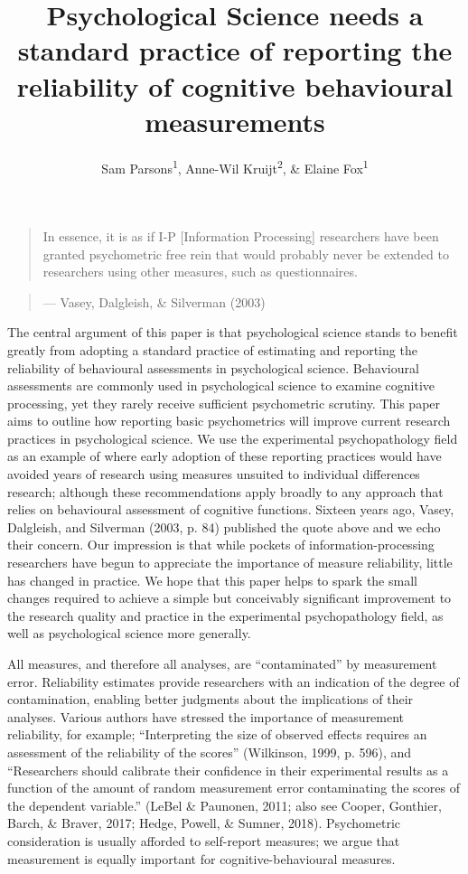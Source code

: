 \documentclass[english,,man,floatsintext]{apa6}
\title{Psychological Science needs a standard practice of reporting the reliability of cognitive behavioural measurements}
\author{Sam Parsons\textsuperscript{1}, Anne-Wil Kruijt\textsuperscript{2}, \& Elaine Fox\textsuperscript{1}}
\date{}
\affiliation{
\vspace{0.5cm}
\textsuperscript{1} Department of Experimental Psychology, University of Oxford\\\textsuperscript{2} Department of Psychology, Stockholm University}
\begin{document}
\maketitle

\setlength{\abovedisplayskip}{-20pt}
\setlength{\belowdisplayskip}{3pt}
\setlength{\abovedisplayshortskip}{-30pt}
\setlength{\belowdisplayshortskip}{3pt}

\begin{quote}
In essence, it is as if I-P {[}Information Processing{]} researchers have been granted psychometric free rein that would probably never be extended to researchers using other measures, such as questionnaires.
\end{quote}

\begin{quote}
\hfill --- Vasey, Dalgleish, \& Silverman (2003)
\end{quote}

The central argument of this paper is that psychological science stands to benefit greatly from adopting a standard practice of estimating and reporting the reliability of behavioural assessments in psychological science. Behavioural assessments are commonly used in psychological science to examine cognitive processing, yet they rarely receive sufficient psychometric scrutiny. This paper aims to outline how reporting basic psychometrics will improve current research practices in psychological science. We use the experimental psychopathology field as an example of where early adoption of these reporting practices would have avoided years of research using measures unsuited to individual differences research; although these recommendations apply broadly to any approach that relies on behavioural assessment of cognitive functions. Sixteen years ago, Vasey, Dalgleish, and Silverman (2003, p. 84) published the quote above and we echo their concern. Our impression is that while pockets of information-processing researchers have begun to appreciate the importance of measure reliability, little has changed in practice. We hope that this paper helps to spark the small changes required to achieve a simple but conceivably significant improvement to the research quality and practice in the experimental psychopathology field, as well as psychological science more generally.

All measures, and therefore all analyses, are \enquote{contaminated} by measurement error. Reliability estimates provide researchers with an indication of the degree of contamination, enabling better judgments about the implications of their analyses. Various authors have stressed the importance of measurement reliability, for example; \enquote{Interpreting the size of observed effects requires an assessment of the reliability of the scores} (Wilkinson, 1999, p. 596), and \enquote{Researchers should calibrate their confidence in their experimental results as a function of the amount of random measurement error contaminating the scores of the dependent variable.} (LeBel \& Paunonen, 2011; also see Cooper, Gonthier, Barch, \& Braver, 2017; Hedge, Powell, \& Sumner, 2018). Psychometric consideration is usually afforded to self-report measures; we argue that measurement is equally important for cognitive-behavioural measures.
\end{document}
